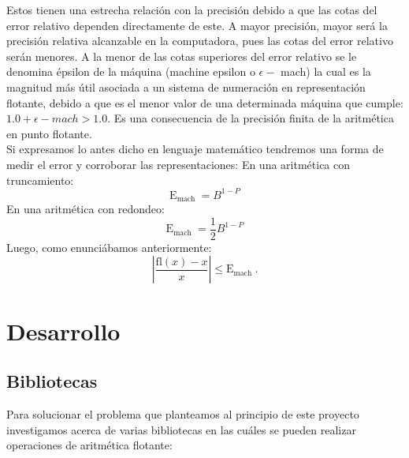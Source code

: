 \documentclass[a4paper,10pt,twocolumn]{article}
\begin{document}
	Estos tienen una estrecha relación con la precisión debido a que las cotas del error relativo dependen directamente de este. A mayor precisión, mayor será la precisión relativa alcanzable en la computadora, pues las cotas del error relativo serán menores. A la menor de las cotas superiores del error relativo se le denomina épsilon de la máquina (machine epsilon o $\epsilon -$ mach) la cual es la magnitud más útil asociada a un sistema de numeración en representación flotante, debido a que es el menor valor de una determinada máquina que cumple: $1.0 + \epsilon-mach > 1.0$. Es una consecuencia de la precisión finita de la aritmética en punto flotante.\\
	
	Si expresamos lo antes dicho en lenguaje matemático tendremos una forma de medir el error y corroborar las representaciones:
	En una aritmética con truncamiento:
	$$
	\mathrm{E}_{\text {mach }}=B^{1-P}
	$$
	En una aritmética con redondeo:
	$$
	\mathrm{E}_{\text {mach }}=\frac{1}{2} B^{1-P}
	$$
	Luego, como enunciábamos anteriormente:
	$$
	\left|\frac{\mathrm{fl}(x)-x}{x}\right| \leq \mathrm{E}_{\text {mach }} .
	$$
	
	
	
	
	\section{Desarrollo}\label{sec:dev}
	
	\subsection*{Bibliotecas}
	
	Para solucionar el problema que planteamos al principio de este proyecto investigamos acerca de varias bibliotecas en las cuáles se pueden realizar operaciones de aritmética flotante: \\
	
\end{document}

